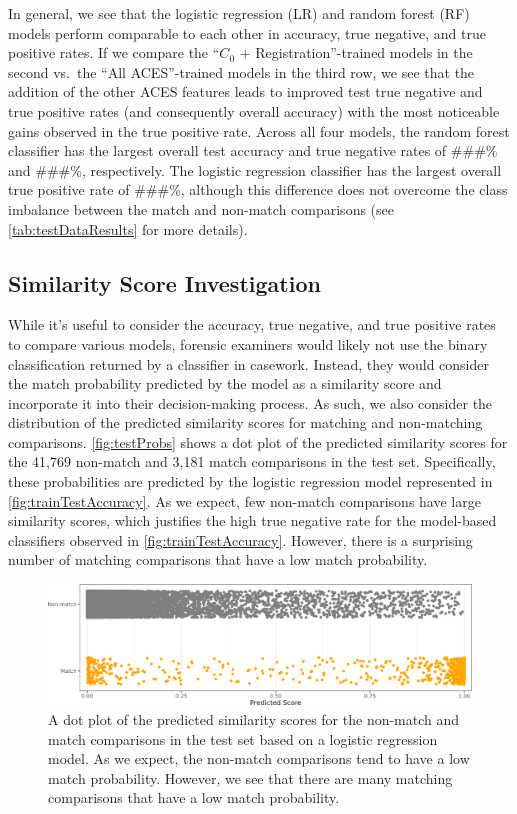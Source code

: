 \documentclass[reprint]{JASA}
\begin{document}
In general, we see that the logistic regression (LR) and random forest
(RF) models perform comparable to each other in accuracy, true negative,
and true positive rates. If we compare the ``\(C_0\) +
Registration''-trained models in the second vs.~the ``All ACES''-trained
models in the third row, we see that the addition of the other ACES
features leads to improved test true negative and true positive rates
(and consequently overall accuracy) with the most noticeable gains
observed in the true positive rate. Across all four models, the random
forest classifier has the largest overall test accuracy and true
negative rates of \#\#\#\% and \#\#\#\%, respectively. The logistic
regression classifier has the largest overall true positive rate of
\#\#\#\%, although this difference does not overcome the class imbalance
between the match and non-match comparisons (see
\autoref{tab:testDataResults} for more details).

\hypertarget{similarity-score-investigation}{%
\subsection{Similarity Score
Investigation}\label{similarity-score-investigation}}

While it's useful to consider the accuracy, true negative, and true
positive rates to compare various models, forensic examiners would
likely not use the binary classification returned by a classifier in
casework. Instead, they would consider the match probability predicted
by the model as a similarity score and incorporate it into their
decision-making process. As such, we also consider the distribution of
the predicted similarity scores for matching and non-matching
comparisons. \autoref{fig:testProbs} shows a dot plot of the predicted
similarity scores for the 41,769 non-match and 3,181 match comparisons
in the test set. Specifically, these probabilities are predicted by the
logistic regression model represented in
\autoref{fig:trainTestAccuracy}. As we expect, few non-match comparisons
have large similarity scores, which justifies the high true negative
rate for the model-based classifiers observed in
\autoref{fig:trainTestAccuracy}. However, there is a surprising number
of matching comparisons that have a low match probability.

\begin{figure}[htbp]

{\centering \includegraphics[width=.5\textwidth]{images/resultsPlots/testProbs_plt} 

}

\caption{\label{fig:testProbs} A dot plot of the predicted similarity scores for the non-match and match comparisons in the test set based on a logistic regression model. As we expect, the non-match comparisons tend to have a low match probability. However, we see that there are many matching comparisons that have a low match probability.}\label{fig:unnamed-chunk-10}
\end{figure}
\end{document}
